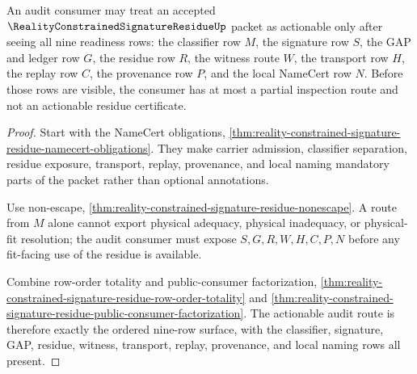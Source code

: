 \begin{theorem}
\label{thm:reality-constrained-signature-residue-audit-consumer-readiness}
An audit consumer may treat an accepted $\RealityConstrainedSignatureResidueUp$
packet as actionable only after seeing all nine readiness rows: the classifier
row $M$, the signature row $S$, the GAP and ledger row $G$, the residue row $R$,
the witness route $W$, the transport row $H$, the replay row $C$, the provenance
row $P$, and the local NameCert row $N$. Before those rows are visible, the
consumer has at most a partial inspection route and not an actionable residue
certificate.
\end{theorem}
\begin{proof}
Start with the NameCert obligations,
\autoref{thm:reality-constrained-signature-residue-namecert-obligations}. They
make carrier admission, classifier separation, residue exposure, transport,
replay, provenance, and local naming mandatory parts of the packet rather than
optional annotations.

Use non-escape,
\autoref{thm:reality-constrained-signature-residue-nonescape}. A route from $M$
alone cannot export physical adequacy, physical inadequacy, or physical-fit
resolution; the audit consumer must expose $S,G,R,W,H,C,P,N$ before any
fit-facing use of the residue is available.

Combine row-order totality and public-consumer factorization,
\autoref{thm:reality-constrained-signature-residue-row-order-totality} and
\autoref{thm:reality-constrained-signature-residue-public-consumer-factorization}.
The actionable audit route is therefore exactly the ordered nine-row surface,
with the classifier, signature, GAP, residue, witness, transport, replay,
provenance, and local naming rows all present.
\end{proof}

